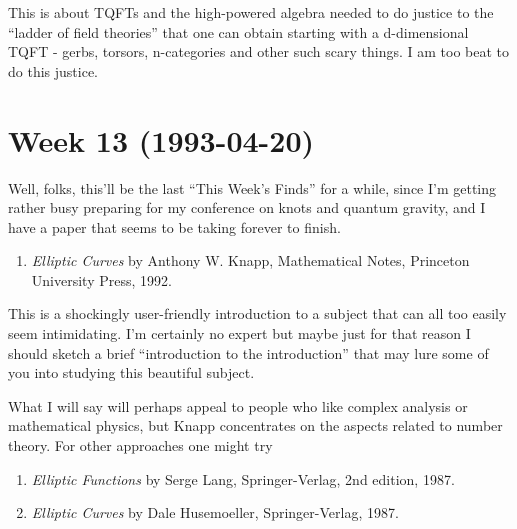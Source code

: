 \documentclass{article}
\def\tightlist{}
\renewcommand{\texttt}[1]{%
  \begingroup
  \ttfamily
  \begingroup\lccode`~=`/\lowercase{\endgroup\def~}{/\discretionary{}{}{}}%
  \begingroup\lccode`~=`[\lowercase{\endgroup\def~}{[\discretionary{}{}{}}%
  \begingroup\lccode`~=`.\lowercase{\endgroup\def~}{.\discretionary{}{}{}}%
  \catcode`/=\active\catcode`[=\active\catcode`.=\active
  \scantokens{#1\noexpand}%
  \endgroup
}
\begin{document}

This is about TQFTs and the high-powered algebra needed to do justice to
the ``ladder of field theories'' that one can obtain starting with a
d-dimensional TQFT - gerbs, torsors, n-categories and other such scary
things. I am too beat to do this justice.
\hypertarget{week-13-1993-04-20}{%
\section{Week 13 (1993-04-20)}\label{week-13-1993-04-20}}

Well, folks, this'll be the last ``This Week's Finds'' for a while,
since I'm getting rather busy preparing for my conference on knots and
quantum gravity, and I have a paper that seems to be taking forever to
finish.

\begin{enumerate}
\def\labelenumi{\arabic{enumi})}
\tightlist
\item
  \emph{Elliptic Curves} by Anthony W. Knapp, Mathematical Notes,
  Princeton University Press, 1992.
\end{enumerate}

This is a shockingly user-friendly introduction to a subject that can
all too easily seem intimidating. I'm certainly no expert but maybe just
for that reason I should sketch a brief ``introduction to the
introduction'' that may lure some of you into studying this beautiful
subject.

What I will say will perhaps appeal to people who like complex analysis
or mathematical physics, but Knapp concentrates on the aspects related
to number theory. For other approaches one might try

\begin{enumerate}
\def\labelenumi{\arabic{enumi})}
\setcounter{enumi}{1}
\item
  \emph{Elliptic Functions} by Serge Lang, Springer-Verlag, 2nd edition,
  1987.
\item
  \emph{Elliptic Curves} by Dale Husemoeller, Springer-Verlag, 1987.
\end{enumerate}
\end{document}

